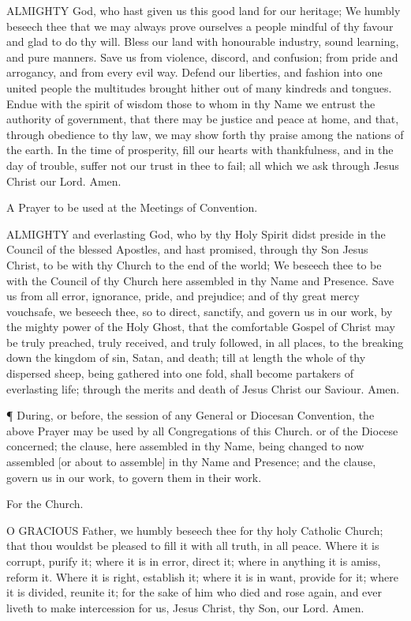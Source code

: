 ALMIGHTY God, who hast given us this good land for our heritage; We humbly beseech thee that we may always prove ourselves a people mindful of thy favour and glad to do thy will. Bless our land with honourable industry, sound learning, and pure manners. Save us from violence, discord, and confusion; from pride and arrogancy, and from every evil way. Defend our liberties, and fashion into one united people the multitudes brought hither out of many kindreds and tongues. Endue with the spirit of wisdom those to whom in thy Name we entrust the authority of government, that there may be justice and peace at home, and that, through obedience to thy law, we may show forth thy praise among the nations of the earth. In the time of prosperity, fill our hearts with thankfulness, and in the day of trouble, suffer not our trust in thee to fail; all which we ask through Jesus Christ our Lord. Amen.

A Prayer to be used at the Meetings of Convention.

ALMIGHTY and everlasting God, who by thy Holy Spirit didst preside in the Council of the blessed Apostles, and hast promised, through thy Son Jesus Christ, to be with thy Church to the end of the world; We beseech thee to be with the Council of thy Church here assembled in thy Name and Presence. Save us from all error, ignorance, pride, and prejudice; and of thy great mercy vouchsafe, we beseech thee, so to direct, sanctify, and govern us in our work, by the mighty power of the Holy Ghost, that the comfortable Gospel of Christ may be truly preached, truly received, and truly followed, in all places, to the breaking down the kingdom of sin, Satan, and death; till at length the whole of thy dispersed sheep, being gathered into one fold, shall become partakers of everlasting life; through the merits and death of Jesus Christ our Saviour. Amen.

¶ During, or before, the session of any General or Diocesan Convention, the above Prayer may be used by all Congregations of this Church. or of the Diocese concerned; the clause, here assembled in thy Name, being changed to now assembled [or about to assemble] in thy Name and Presence; and the clause, govern us in our work, to govern them in their work.

For the Church.

O GRACIOUS Father, we humbly beseech thee for thy holy Catholic Church; that thou wouldst be pleased to fill it with all truth, in all peace. Where it is corrupt, purify it; where it is in error, direct it; where in anything it is amiss, reform it. Where it is right, establish it; where it is in want, provide for it; where it is divided, reunite it; for the sake of him who died and rose again, and ever liveth to make intercession for us, Jesus Christ, thy Son, our Lord. Amen.

